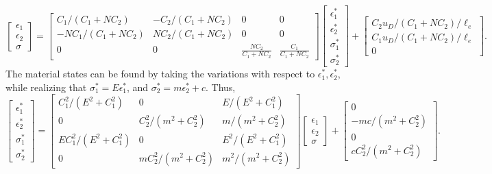 \documentclass[12pt]{elsarticle}
\begin{document}
\begin{equation}
	\begin{bmatrix}
		\epsilon_1 \\
		\epsilon_2 \\
		\sigma
	\end{bmatrix}
	=
	\begin{bmatrix}
		C_1/(C_1+NC_2) & -C_2/(C_1+NC_2) & 0 & 0 \\
		-NC_1/(C_1+NC_2) & NC_2/(C_1+NC_2) & 0 & 0 \\
		0 & 0 & \frac{NC_2}{C_1+N C_2} & \frac{C_1}{C_1+N C_2}
	\end{bmatrix}
	\begin{bmatrix}
		\epsilon_1^* \\
		\epsilon_2^* \\
		\sigma_1^* \\
		\sigma_2^* 
	\end{bmatrix}
	+
	\begin{bmatrix}
		C_2 u_D/(C_1+NC_2)/\ell_e \\
		C_1 u_D/(C_1+NC_2)/\ell_e  \\
		0	
	\end{bmatrix}
	.
\end{equation}
The material states can be found by taking the variations with respect to $\epsilon_1^*, \epsilon_2^*$, while realizing that $\sigma_1^*=E\epsilon_1^*$, and $\sigma_2^*=m\epsilon_2^*+c$. Thus,
\begin{equation}
	\begin{bmatrix}
		\epsilon_1^* \\
		\epsilon_2^* \\
		\sigma_1^* \\
		\sigma_2^* 
	\end{bmatrix} 
	= 
	\begin{bmatrix}
		C_1^2/(E^2 + C_1^2) & 0 & E/(E^2 + C_1^2) \\
		0 & C_2^2/(m^2 + C_2^2)  & m/(m^2 + C_2^2) \\
		E C_1^2/(E^2 + C_1^2) & 0 & E^2/(E^2 + C_1^2)\\
		0 & mC_2^2/(m^2 + C_2^2)  & m^2/(m^2 + C_2^2) 
	\end{bmatrix} 
	\begin{bmatrix}
		\epsilon_1 \\
		\epsilon_2 \\
		\sigma
	\end{bmatrix} + 
	\begin{bmatrix}
		0 \\
		-mc/(m^2+C_2^2) \\
		0 \\
		cC_2^2/(m^2+C_2^2)
	\end{bmatrix} .
\end{equation}
\end{document}
